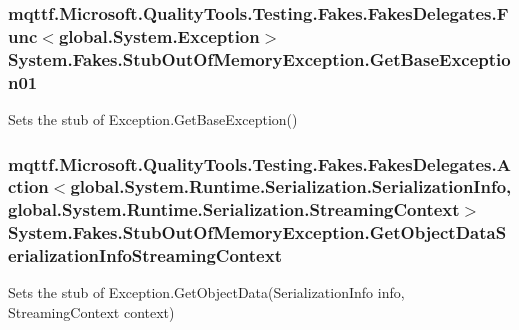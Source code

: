 \hypertarget{class_system_1_1_fakes_1_1_stub_out_of_memory_exception_a566b516f3b871db6bcdf70ba969fd065}{
\subsubsection[{Get\-Base\-Exception01}]{\setlength{\rightskip}{0pt plus 5cm}mqttf.\-Microsoft.\-Quality\-Tools.\-Testing.\-Fakes.\-Fakes\-Delegates.\-Func$<$global.\-System.\-Exception$>$ System.\-Fakes.\-Stub\-Out\-Of\-Memory\-Exception.\-Get\-Base\-Exception01}}\label{class_system_1_1_fakes_1_1_stub_out_of_memory_exception_a566b516f3b871db6bcdf70ba969fd065}


Sets the stub of Exception.\-Get\-Base\-Exception()

\hypertarget{class_system_1_1_fakes_1_1_stub_out_of_memory_exception_a8f02700381c7b8e2251e7248db0c611a}{
\subsubsection[{Get\-Object\-Data\-Serialization\-Info\-Streaming\-Context}]{\setlength{\rightskip}{0pt plus 5cm}mqttf.\-Microsoft.\-Quality\-Tools.\-Testing.\-Fakes.\-Fakes\-Delegates.\-Action$<$global.\-System.\-Runtime.\-Serialization.\-Serialization\-Info, global.\-System.\-Runtime.\-Serialization.\-Streaming\-Context$>$ System.\-Fakes.\-Stub\-Out\-Of\-Memory\-Exception.\-Get\-Object\-Data\-Serialization\-Info\-Streaming\-Context}}\label{class_system_1_1_fakes_1_1_stub_out_of_memory_exception_a8f02700381c7b8e2251e7248db0c611a}


Sets the stub of Exception.\-Get\-Object\-Data(\-Serialization\-Info info, Streaming\-Context context)

